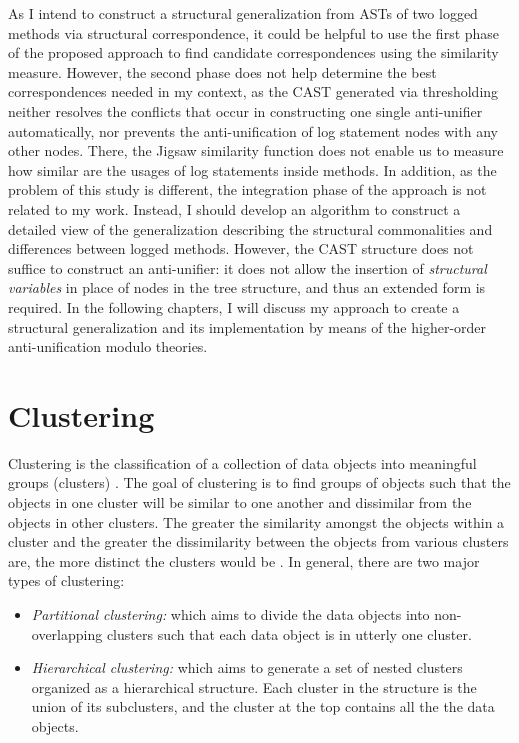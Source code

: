 As I intend to construct a structural generalization from ASTs of two logged methods via structural correspondence, it could be helpful to use the first phase of the proposed approach to find candidate correspondences using the similarity measure. However, the second phase does not help determine the best correspondences needed in my context, as the CAST generated via thresholding neither resolves the conflicts that occur in constructing one single anti-unifier automatically, nor prevents the anti-unification of log statement nodes with any other nodes. There, the Jigsaw similarity function does not enable us to measure how similar are the usages of log statements inside methods. In addition, as the problem of this study is different, the integration phase of the approach is not related to my work. Instead, I should develop an algorithm to construct a detailed view of the generalization describing the structural commonalities and differences between logged methods. However, the CAST structure does not suffice to construct an anti-unifier: it does not allow the insertion of \emph{structural variables} in place of nodes in the tree structure, and thus an extended form is required. In the following chapters, I will discuss my approach to create a structural generalization and its implementation by means of the higher-order anti-unification modulo theories.
\section{Clustering}  \label{ch3-clustering}
Clustering is the classification of a collection of data objects into meaningful groups (clusters) \cite{jain1999data}. The goal of clustering is to find groups of objects such that the objects in one cluster will be similar to one another and dissimilar from the objects in other clusters. The greater the similarity amongst the objects within a cluster and the greater the dissimilarity between the objects from various clusters are, the more distinct the clusters would be \cite{}.  In general, there are two major types of clustering:

\begin{itemize} [leftmargin=.4in]
\item \emph{Partitional clustering:} which aims to divide the data objects into non-overlapping clusters such that each data object is in utterly one cluster.
\item \emph{Hierarchical clustering:} which aims to generate a set of nested clusters organized as a hierarchical structure. Each cluster in the structure is the union of its subclusters, and the cluster at the top contains all the the data objects.
\end{itemize}

